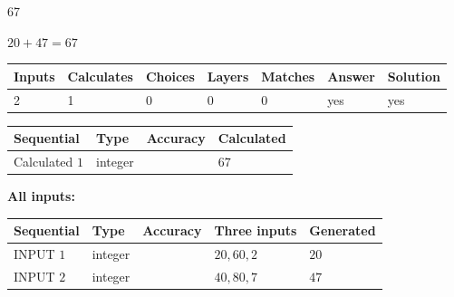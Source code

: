\documentclass{ctexart}
\begin{document}
 

67
 
 
\noindent{}
 
 

 
 
 
\noindent{}
 
 

$ %
20 +  %
47=   %
67$
 
 
\noindent{}
 
 

 
   
   
   
   
\noindent\begin{tabular}{|l|l|l|l|l|l|l|}
 \hline
Inputs & Calculates & Choices & Layers & Matches & Answer & Solution \\ \hline
 2  & 
 1  & 
 0
  & 
 0  & 
 0  & 
  yes & 
  yes 
  \\ \hline
 \end{tabular}
   
   
   
   
\noindent{}
   
   
  
  
\noindent\begin{tabular}{|l|l|l|l|}
\hline
 Sequential & Type & Accuracy & Calculated \\ 
\hline
 
 
  Calculated $  1 $ & integer &  & 
  $ 67 $ 
 \\  \hline  
 \end{tabular}
   
   
   
   
\noindent\vspace{0.1in}\hspace{-0.08in} {\textbf{\Large{All inputs: }}}
   
   
  
  
\noindent\begin{tabular}{|l|l|l|l|l|}
\hline
 Sequential & Type & Accuracy & Three inputs & Generated \\ 
\hline
 
 
  INPUT $  1 $ & integer &  & $
 20
 , 
 60
 , 
 2
 $ & $ 20 $ 
 \\  \hline  
 
 
  INPUT $  2 $ & integer &  & $
 40
 , 
 80
 , 
 7
 $ & $ 47 $ 
 \\  \hline  
 \end{tabular}
   
\end{document}
